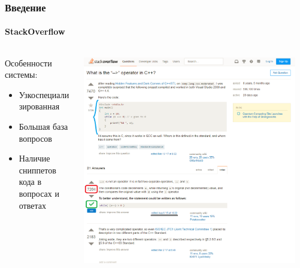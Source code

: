 \documentclass[10pt]{beamer}
\begin{document}

\begin{frame}
\frametitle{Введение}
\framesubtitle{StackOverflow}

\begin{columns}
    \begin{column}{0.4\textwidth}
    	Особенности системы:
    	\begin{itemize}
			\item Узкоспециализированная
			\item Большая база вопросов
			\item Наличие сниппетов кода в вопросах и ответах
    	\end{itemize}
    \end{column}
    \begin{column}{0.6\textwidth}
        \begin{center}
            \includegraphics[width=0.95\textwidth]{images/stackoverflow_screen.png}
        \end{center}
    \end{column}
\end{columns}

\end{frame}

\end{document}
